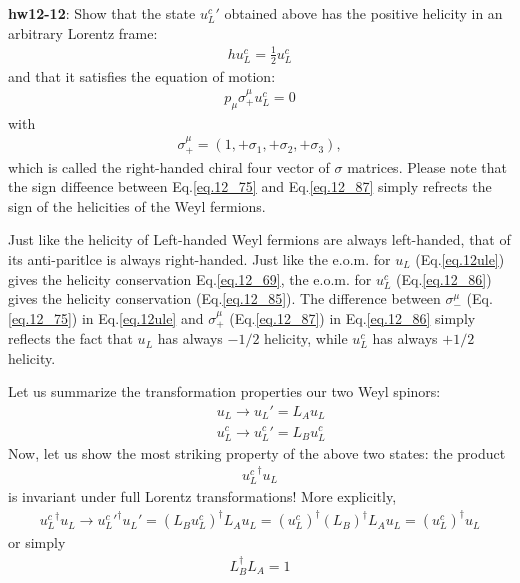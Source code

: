 \documentclass[12pt]{article}
\begin{document}
{\bf hw12-12}: Show that the state ${u_L^c}'$ obtained above has the positive
  helicity in an arbitrary Lorentz frame:
\begin{eqnarray}
  h u_L^c = \frac{1}{2} u_L^c \label{eq.12_85}
\end{eqnarray}
   and that it satisfies the equation of motion:
\begin{eqnarray}
  p_\mu \sigma_+^\mu u_L^c = 0 \label{eq.12_86}
\end{eqnarray}
  with
\begin{eqnarray}
  \sigma_+^\mu = (1, +\sigma_1, +\sigma_2, +\sigma_3), \label{eq.12_87}
\end{eqnarray}
  which is called the right-handed chiral four vector of $\sigma$ matrices.
  Please note that the sign diffeence between Eq.\ref{eq.12_75} and Eq.\ref{eq.12_87} simply refrects the sign of the helicities of the Weyl fermions.

  Just like the helicity of Left-handed Weyl fermions are always
  left-handed, that of its anti-paritlce is always right-handed.
  Just like the e.o.m. for $u_L$ (Eq.\ref{eq.12ule}) gives the helicity conservation Eq.\ref {eq.12_69}, the e.o.m. for $u_L^c$ (Eq.\ref{eq.12_86}) gives the helicity conservation (Eq.\ref{eq.12_85}).  The difference between $\sigma_-^\mu$ (Eq.\ref{eq.12_75}) in Eq.\ref{eq.12ule} and $\sigma_+^\mu$ (Eq.\ref{eq.12_87}) in Eq.\ref{eq.12_86} simply reflects the fact that $u_L$ has always $-1/2$ helicity, while $u_L^c$ has always $+1/2$ helicity.


  Let us summarize the transformation properties our two Weyl spinors:
\begin{eqnarray}
  && u_L   \to   u_L'    = L_A u_L \label{eq.12_88a} \\
  && u_L^c \to  {u_L^c}' = L_B u_L^c \label{eq.12_88b}
\end{eqnarray}
   Now, let us show the most striking property of the above two states:
  the product
\begin{eqnarray}
  {u_L^c}^\dagger u_L \label{eq.12_89}
\end{eqnarray}
  is invariant under full Lorentz transformations!  More explicitly,
\begin{eqnarray}
  {u_L^c}^\dagger u_L
  \to 
   {u_L^c}'^\dagger u_L'
 = (L_B u_L^c)^\dagger L_A u_L
 = (u_L^c)^\dagger (L_B)^\dagger L_A u_L
 = (u_L^c)^\dagger u_L \label{eq.12_90}
\end{eqnarray}
  or simply
\begin{eqnarray}
  L_B^\dagger L_A = 1 \label{eq.12_91}
\end{eqnarray}
\end{document}
